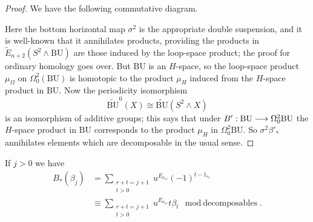 \documentclass[../main]{subfiles}
\begin{document}
\begin{proof}
We have the following commutative diagram.
\begin{center}
\end{center}
Here the bottom horizontal map $\sigma^2$ is the appropriate double suspension, and it is well-known that it annihilates products, providing the products in $\widetilde{E}_{n+2}(S^2\wedge\mathrm{BU})$ are those induced by the loop-space product; the proof for ordinary homology goes over. But $\mathrm{BU}$ is an $H$-space, so the loop-space product $\mu_\Omega$ on $\Omega_0^2(\mathrm{BU})$ is homotopic to the product $\mu_H$ induced from the $H$-space product in $\mathrm{BU}$. Now the periodicity isomorphism $$\widetilde{\mathrm{BU}}^0(X)\cong \widetilde{\mathrm{BU}}(S^2\wedge X)$$ is an isomorphism of additive groups; this says that under $B':\mathrm{BU}\longrightarrow\Omega^2_0\mathrm{BU}$ the $H$-space product in $\mathrm{BU}$ corresponds to the product $\mu_H$ in $\Omega_0^2\mathrm{BU}$. So $\sigma^2\beta'_\ast$ annihilates elements which are decomposable in the usual sense.
\end{proof}
\begin{proposition}
\label{prop:p2c12.6}
If $j>0$ we have
\begin{align*}
B_\ast(\beta_j) &= \sum_{\substack{r+t=j+1\\t>0}} u^{E_{a_{1r}}} (-1)^{t-1_{s_t}}\\
&\equiv \sum_{\substack{r+t=j+1\\t>0}} u^{E_{a_{1r}}} t\beta_t \mod{\text{decomposables}}.
\end{align*}
\end{proposition}
\end{document}
